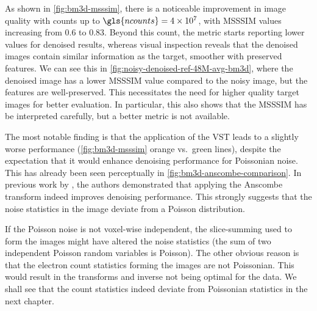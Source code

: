 As shown in \cref{fig:bm3d-msssim}, there is a noticeable improvement in image quality with counts up to $\gls{ncounts}=\num{4e7}$, with \gls{MSSSIM} values increasing from \num{0.6} to \num{0.83}. Beyond this count, the metric starts reporting lower values for denoised results, whereas visual inspection reveals that the denoised images contain similar information as the target, smoother with preserved features. We can see this in \cref{fig:noisy-denoised-ref-48M-avg-bm3d}, where the denoised image has a lower \gls{MSSSIM} value compared to the noisy image, but the features are well-preserved. This necessitates the need for higher quality target images for better evaluation. In particular, this also shows that the \gls{MSSSIM} has be interpreted carefully, but a better metric is not available.

The most notable finding is that the application of the \gls{VST} leads to a slightly worse performance (\cref{fig:bm3d-msssim} orange vs.\ green lines), despite the expectation that it would enhance denoising performance for Poissonian noise. This has already been seen perceptually in \cref{fig:bm3d-anscombe-comparison}. In previous work by \citeauthor{makitaloOptimalInversionAnscombe2011}, the authors demonstrated that applying the Anscombe transform indeed improves denoising performance. This strongly suggests that the noise statistics in the image deviate from a Poisson distribution. 


If the Poisson noise is not voxel-wise independent, the slice-summing used to form the images might have altered the noise statistics (the sum of two independent Poisson random variables is Poisson). The other obvious reason is that the electron count statistics forming the images are not Poissonian. This would result in the transforms and inverse not being optimal for the data. We shall see that the count statistics indeed deviate from Poissonian statistics in the next chapter.
